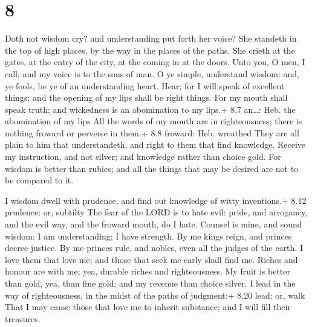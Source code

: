 \hypertarget{section-7}{%
\section{8}\label{section-7}}

 Doth not wisdom cry? and understanding put forth her voice?
 She standeth in the top of high places, by the way in the
places of the paths.  She crieth at the gates, at the entry
of the city, at the coming in at the doors.  Unto you, O
men, I call; and my voice is to the sons of man.  O ye
simple, understand wisdom: and, ye fools, be ye of an understanding
heart.  Hear; for I will speak of excellent things; and the
opening of my lips shall be right things.  For my mouth
shall speak truth; and wickedness is an abomination to my lips.+ 8.7
an\ldots: Heb. the abomination of my lips  All the words of
my mouth are in righteousness; there is nothing froward or perverse in
them.+ 8.8 froward: Heb. wreathed  They are all plain to him
that understandeth, and right to them that find knowledge. 
Receive my instruction, and not silver; and knowledge rather than choice
gold.  For wisdom is better than rubies; and all the things
that may be desired are not to be compared to it.

 I wisdom dwell with prudence, and find out knowledge of
witty inventions.+ 8.12 prudence: or, subtilty  The fear of
the LORD is to hate evil: pride, and arrogancy, and the evil way, and
the froward mouth, do I hate.  Counsel is mine, and sound
wisdom: I am understanding; I have strength.  By me kings
reign, and princes decree justice.  By me princes rule, and
nobles, even all the judges of the earth.  I love them that
love me; and those that seek me early shall find me. 
Riches and honour are with me; yea, durable riches and righteousness.
 My fruit is better than gold, yea, than fine gold; and my
revenue than choice silver.  I lead in the way of
righteousness, in the midst of the paths of judgment:+ 8.20 lead: or,
walk  That I may cause those that love me to inherit
substance; and I will fill their treasures.

